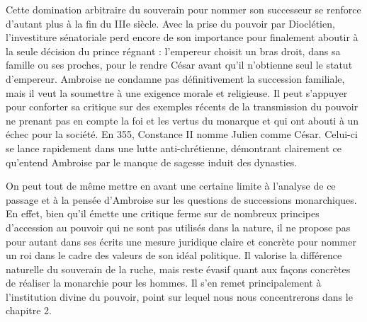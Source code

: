 \bigskip

Cette domination arbitraire du souverain pour nommer son successeur se renforce d'autant plus à la fin du IIIe siècle. Avec la prise du pouvoir par Dioclétien, l’investiture sénatoriale perd encore de son importance pour finalement aboutir à la seule décision du prince régnant : l’empereur choisit un bras droit, dans sa famille ou ses proches, pour le rendre César avant qu’il n’obtienne seul le statut d’empereur\autocite[349]{palanque_ambroise}. Ambroise ne condamne pas définitivement la succession familiale, mais il veut la soumettre à une exigence morale et religieuse. Il peut s’appuyer pour conforter sa critique sur des exemples récents de la transmission du pouvoir ne prenant pas en compte la foi et les vertus du monarque et qui ont abouti à un échec pour la société. En 355, Constance II nomme Julien comme César. Celui-ci se lance rapidement dans une lutte anti-chrétienne, démontrant clairement ce qu’entend Ambroise par le manque de sagesse induit des dynasties.

\bigskip

On peut tout de même mettre en avant une certaine limite à l'analyse de ce passage et à la pensée d'Ambroise sur les questions de successions monarchiques. En effet, bien qu'il émette une critique ferme sur de nombreux principes d'accession au pouvoir qui ne sont pas utilisés dans la nature, il ne propose pas pour autant dans ses écrits une mesure juridique claire et concrète pour nommer un roi dans le cadre des valeurs de son idéal politique. Il valorise la différence naturelle du souverain de la ruche, mais reste évasif quant aux façons concrètes de réaliser la monarchie pour les hommes. Il s'en remet principalement à l'institution divine du pouvoir, point sur lequel nous nous concentrerons dans le chapitre 2.

\bigskip

